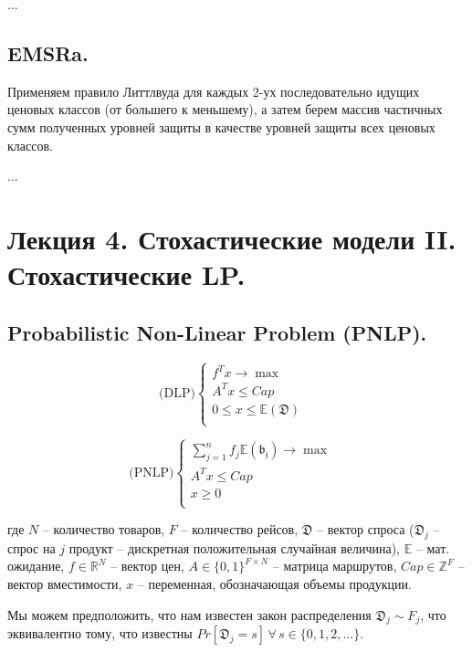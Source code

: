 \documentclass[reqno]{article}
\theoremstyle{definition}
\theoremstyle{definition}
\theoremstyle{definition}
\theoremstyle{definition}
\theoremstyle{definition}
\theoremstyle{definition}
\theoremstyle{definition}
\theoremstyle{definition}
\theoremstyle{definition}
\begin{document}
		...
		
		
		\subsection{EMSRa.}
		Применяем правило Литтлвуда для каждых 2-ух последовательно идущих ценовых классов (от большего к меньшему), а затем берем массив частичных сумм полученных уровней защиты в качестве уровней защиты всех ценовых классов.
		
		...
		
	
	\newpage
	\section{Лекция 4. Стохастические модели II. Стохастические LP.}
			
		\subsection{Probabilistic Non-Linear Problem (PNLP).}
		
		\begin{multicols}{2}
			$$
			\text{(DLP)}
			\begin{cases}
				f^Tx \rightarrow \max & \\
				A^Tx \leq Cap & \\
				0 \leq x \leq \mathds{E}(\mathfrak{D}) & \\
			\end{cases}	
			$$
			
			\columnbreak
			
			$$
			\text{(PNLP)}
			\begin{cases}
				\sum\limits_{j=1}^n f_j \mathds{E}(\mathfrak{b_j}) \rightarrow \max & \\
				A^Tx \leq Cap & \\
				x \geq 0 & \\
			\end{cases}
			$$
		\end{multicols}
		
		где $N$ -- количество товаров, $F$ -- количество рейсов, $\mathfrak{D}$ -- вектор спроса ($\mathfrak{D}_j$ -- спрос на $j$ продукт -- дискретная положительная случайная величина), $\mathds{E}$ -- мат. ожидание, $f \in \mathds{R}^N$ -- вектор цен, $A \in \{0, 1\}^{F \times N}$ -- матрица маршрутов, $Cap \in \mathds{Z}^F$ -- вектор вместимости, $x$ -- переменная, обозначающая объемы продукции.
		
		Мы можем предположить, что нам известен закон распределения $\mathfrak{D}_j \sim F_j$, что эквивалентно тому, что известны $Pr[\mathfrak{D}_j = s]\,\forall\,s \in \{0, 1, 2, ...\}$.
		
\end{document}
